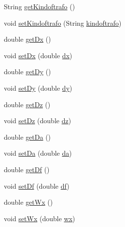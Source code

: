 \begin{DoxyCompactItemize}
\item 
String \hyperlink{classparams_1_1_control_parms_ab0e48205eade41505b94b657f2140f10}{get\+Kindoftrafo} ()
\item 
void \hyperlink{classparams_1_1_control_parms_ac6f495c9f6f219b55a689cbac7b6da36}{set\+Kindoftrafo} (String \hyperlink{classparams_1_1_control_parms_afcfdabbc39158e0ae25e47d76a6dc2a4}{kindoftrafo})
\item 
double \hyperlink{classparams_1_1_control_parms_a5abf1cdcdffb8d4f7083ddcd0782b89a}{get\+Dx} ()
\item 
void \hyperlink{classparams_1_1_control_parms_af79a3047660dd028f9b68cb6726ca185}{set\+Dx} (double \hyperlink{classparams_1_1_control_parms_ac33290885ff9f6559cb4864a5fbaedb0}{dx})
\item 
double \hyperlink{classparams_1_1_control_parms_a0b3471d9fb26c5e9fcbc7933fa84faf8}{get\+Dy} ()
\item 
void \hyperlink{classparams_1_1_control_parms_a17584fe9dae43307ba1c060986ca1c7f}{set\+Dy} (double \hyperlink{classparams_1_1_control_parms_ab6b652d7f1f9ac1dba4a12c2cf2696cb}{dy})
\item 
double \hyperlink{classparams_1_1_control_parms_afa1b48294cf0a1355ec97eb139eee4d1}{get\+Dz} ()
\item 
void \hyperlink{classparams_1_1_control_parms_a90515ffb3445da1c793b30bd39403d83}{set\+Dz} (double \hyperlink{classparams_1_1_control_parms_aa3bc4f90d701204615fc84404b5c47f0}{dz})
\item 
double \hyperlink{classparams_1_1_control_parms_a4252f7cdf5b712aa872beaf0af90a0f0}{get\+Da} ()
\item 
void \hyperlink{classparams_1_1_control_parms_a5dbf6d0fcc824987a05fd389690009ef}{set\+Da} (double \hyperlink{classparams_1_1_control_parms_af7874df2feb2be8ca0f3a7f1250ef7fd}{da})
\item 
double \hyperlink{classparams_1_1_control_parms_aac8835837cbd44642c4f99a2e4432d88}{get\+Df} ()
\item 
void \hyperlink{classparams_1_1_control_parms_a6454d68b7f953a28d11b54e141a92e30}{set\+Df} (double \hyperlink{classparams_1_1_control_parms_a3dfb56045add56099f7321b470f5d9fe}{df})
\item 
double \hyperlink{classparams_1_1_control_parms_a421e53e86089f32021bec5dbcd4954ef}{get\+Wx} ()
\item 
void \hyperlink{classparams_1_1_control_parms_a997a3be490eaf52c7a3a24c7e459debe}{set\+Wx} (double \hyperlink{classparams_1_1_control_parms_a08c3a014edb82ee19a2b046a07efbac5}{wx})

\end{DoxyCompactItemize}

